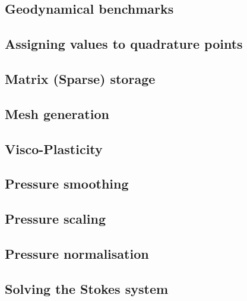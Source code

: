 \documentclass[a4paper]{article}
\begin{document}
\subsection{Geodynamical benchmarks}  %
\newpage %
\subsection{Assigning values to quadrature points}  %
\newpage %
\subsection{Matrix (Sparse) storage}  %
\newpage %
\subsection{Mesh generation} \label{subsection_meshes}  %
\newpage %
\subsection{Visco-Plasticity}  %
\newpage %
\subsection{Pressure smoothing \label{psmoothing}}  %
\newpage %
\subsection{Pressure scaling}  %
\newpage %
\subsection{Pressure normalisation\label{ss_pnorm}}  %
\newpage %
\subsection{Solving the Stokes system \label{sec:solvers}}  %
\newpage %
\end{document}
